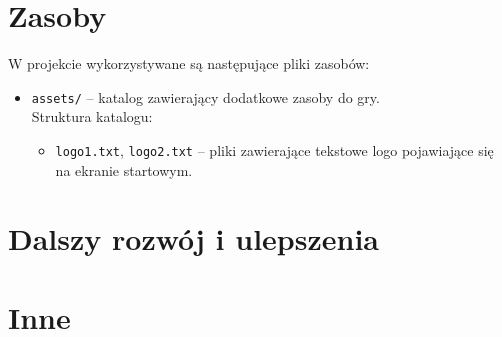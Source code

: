 \documentclass{article}
\begin{document}
\section{Zasoby}

W projekcie wykorzystywane są następujące pliki zasobów:
    \begin{itemize}
    \item \texttt{assets/} – katalog zawierający dodatkowe zasoby do gry.\\
    Struktura katalogu:
        \begin{itemize}
            \item \texttt{logo1.txt}, \texttt{logo2.txt} – pliki zawierające tekstowe logo pojawiające się na ekranie startowym.
        \end{itemize}
    \end{itemize}

\section{Dalszy rozwój i ulepszenia}

\section{Inne}
\end{document}
